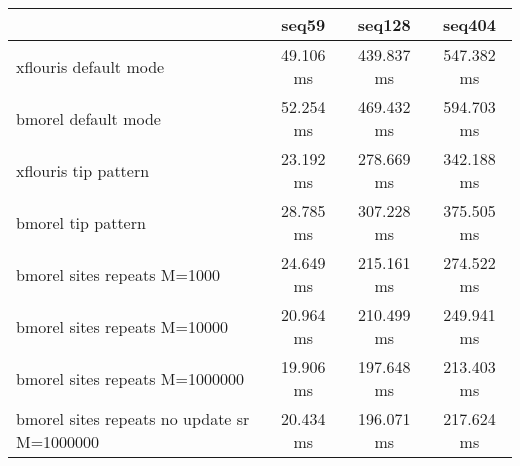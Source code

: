 \begin{tabular}{|l|c|c|c|}
\hline
 & seq59 & seq128 & seq404  \\
\hline
xflouris default mode & 49.106 ms & 439.837 ms & 547.382 ms\\
\hline
bmorel default mode & 52.254 ms & 469.432 ms & 594.703 ms\\
\hline
xflouris tip pattern & 23.192 ms & 278.669 ms & 342.188 ms\\
\hline
bmorel tip pattern & 28.785 ms & 307.228 ms & 375.505 ms\\
\hline
bmorel sites repeats M=1000 & 24.649 ms & 215.161 ms & 274.522 ms\\
\hline
bmorel sites repeats M=10000 & 20.964 ms & 210.499 ms & 249.941 ms\\
\hline
bmorel sites repeats M=1000000 & 19.906 ms & 197.648 ms & 213.403 ms\\
\hline
bmorel sites repeats no update sr  M=1000000 & 20.434 ms & 196.071 ms & 217.624 ms\\
\hline
\end{tabular}
